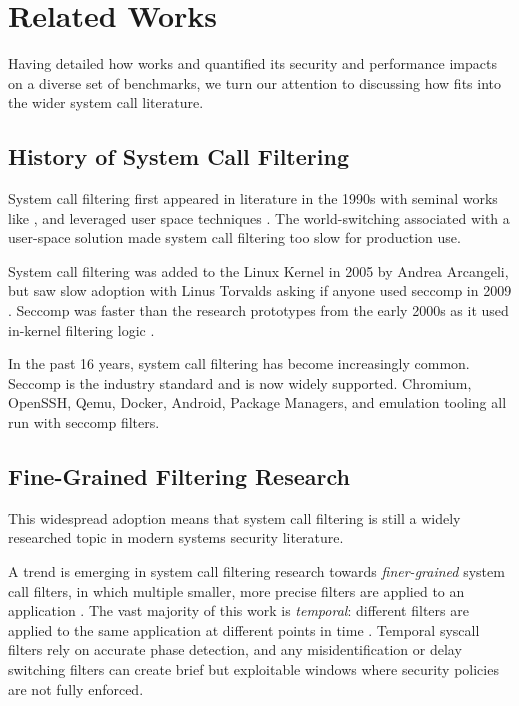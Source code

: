 \section{Related Works}\label{sec:related-works}

Having detailed how \af works and quantified its security and performance
impacts on a diverse set of benchmarks, we turn our attention to discussing how
\af fits into the wider system call literature.

\subsection{History of System Call Filtering}

System call filtering first appeared in literature in the 1990s with seminal
works like \textcite{wagner1999janus}, and leveraged
user space techniques \cite{somayaji2000automated, garfinkel2004ostia}. The world-switching associated with a user-space solution made
system call filtering too slow for production use.

System call filtering was added to the Linux Kernel in 2005 by Andrea Arcangeli, but
saw slow adoption with Linus Torvalds asking if anyone used seccomp in
2009 \cite{arcangeli_seccomp_2005, TORVALDS_ANYONE_USES_SECCOMP}. Seccomp was
faster than the research prototypes from the early 2000s as it used in-kernel
filtering logic \cite{jia2023programmablesecurityebpf}.

In the past 16 years, system call filtering has become increasingly common.
Seccomp is the industry standard and is now widely supported. Chromium, OpenSSH,
Qemu, Docker, Android, Package Managers, and emulation tooling all run with
seccomp filters.

\subsection{Fine-Grained Filtering Research}

This widespread adoption means that system call filtering is still a widely
researched topic in modern systems security literature. 

A trend is emerging in system call filtering research towards 
\textit{finer-grained} system call filters, in which multiple smaller, more
precise filters are applied to an application 
\cite{SYSPART, SYSXCHG, ahad2023freepart}. The vast majority of this work is
\textit{temporal}: different filters are applied to the same application at
different points in time \cite{SYSPART, TEMPORAL_SPEC}. Temporal syscall
filters rely on accurate phase detection, and any misidentification or delay
switching filters can create brief but exploitable windows where security
policies are not fully enforced. 

